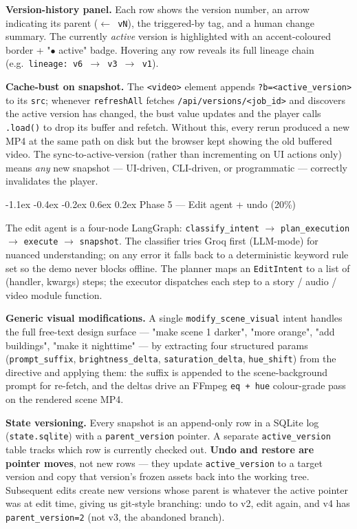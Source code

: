 \documentclass[11pt,a4paper]{article}
\makeatletter
\renewcommand\subsection{\@startsection{subsection}{2}{\z@}%
   {-1.1ex \@plus -0.4ex \@minus -0.2ex}%
   {0.6ex \@plus 0.2ex}%
   {\large\bfseries\color{accent!85!black}}}
\newcommand{\rarr}{\(\rightarrow\)}
\newcommand{\code}[1]{\texttt{\small #1}}
\makeatother
\begin{document}
\textbf{Version-history panel.} Each row shows the version number, an arrow
indicating its parent (\code{$\leftarrow$ vN}), the triggered-by tag, and a
human change summary. The currently \emph{active} version is highlighted with
an accent-coloured border + "$\bullet$ active" badge. Hovering any row reveals
its full lineage chain (e.g.\ \code{lineage: v6 \rarr{} v3 \rarr{} v1}).

\textbf{Cache-bust on snapshot.} The \code{<video>} element appends
\code{?b=<active\_version>} to its \code{src}; whenever \code{refreshAll}
fetches \code{/api/versions/<job\_id>} and discovers the active version has
changed, the bust value updates and the player calls \code{.load()} to drop
its buffer and refetch. Without this, every rerun produced a new MP4 at the
same path on disk but the browser kept showing the old buffered video. The
sync-to-active-version (rather than incrementing on UI actions only) means
\emph{any} new snapshot --- UI-driven, CLI-driven, or programmatic ---
correctly invalidates the player.

\subsection{Phase 5 --- Edit agent + undo (20\%)}

The edit agent is a four-node LangGraph: \code{classify\_intent} \rarr{}
\code{plan\_execution} \rarr{} \code{execute} \rarr{} \code{snapshot}. The
classifier tries Groq first (LLM-mode) for nuanced understanding; on any error
it falls back to a deterministic keyword rule set so the demo never blocks
offline. The planner maps an \code{EditIntent} to a list of (handler, kwargs)
steps; the executor dispatches each step to a story / audio / video module
function.

\textbf{Generic visual modifications.} A single \code{modify\_scene\_visual}
intent handles the full free-text design surface --- "make scene 1 darker",
"more orange", "add buildings", "make it nighttime" --- by extracting four
structured params (\code{prompt\_suffix}, \code{brightness\_delta},
\code{saturation\_delta}, \code{hue\_shift}) from the directive and applying
them: the suffix is appended to the scene-background prompt for re-fetch, and
the deltas drive an FFmpeg \code{eq + hue} colour-grade pass on the rendered
scene MP4.

\textbf{State versioning.} Every snapshot is an append-only row in a SQLite log
(\code{state.sqlite}) with a \code{parent\_version} pointer. A separate
\code{active\_version} table tracks which row is currently checked out.
\textbf{Undo and restore are pointer moves}, not new rows --- they update
\code{active\_version} to a target version and copy that version's frozen
assets back into the working tree. Subsequent edits create new versions whose
parent is whatever the active pointer was at edit time, giving us git-style
branching: undo to v2, edit again, and v4 has \code{parent\_version=2} (not
v3, the abandoned branch).
\end{document}

